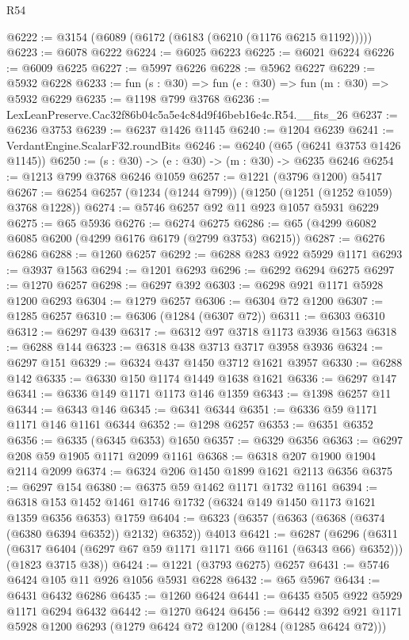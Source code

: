 \begin{lexlean}{R54}
\begin{coremodule}
@6222 := @3154 (@6089 (@6172 (@6183 (@6210 (@1176 @6215 @1192)))))
@6223 := @6078 @6222
@6224 := @6025 @6223
@6225 := @6021 @6224
@6226 := @6009 @6225
@6227 := @5997 @6226
@6228 := @5962 @6227
@6229 := @5932 @6228
@6233 := fun (s : @30) => fun (e : @30) => fun (m : @30) => @5932 @6229
@6235 := @1198 @799 @3768
@6236 := LexLeanPreserve.Cac32f86b04c5a5e4c84d9f46beb16e4c.R54.__fits_26
@6237 := @6236 @3753
@6239 := @6237 @1426 @1145
@6240 := @1204 @6239
@6241 := VerdantEngine.ScalarF32.roundBits
@6246 := @6240 (@65 (@6241 @3753 @1426 @1145))
@6250 := (s : @30) -> (e : @30) -> (m : @30) -> @6235 @6246
@6254 := @1213 @799 @3768 @6246 @1059
@6257 := @1221 (@3796 @1200) @5417
@6267 := @6254 @6257 (@1234 (@1244 @799)) (@1250 (@1251 (@1252 @1059) @3768 @1228))
@6274 := @5746 @6257 @92 @11 @923 @1057 @5931 @6229
@6275 := @65 @5936
@6276 := @6274 @6275
@6286 := @65 (@4299 @6082 @6085 @6200 (@4299 @6176 @6179 (@2799 @3753) @6215))
@6287 := @6276 @6286
@6288 := @1260 @6257
@6292 := @6288 @283 @922 @5929 @1171
@6293 := @3937 @1563
@6294 := @1201 @6293
@6296 := @6292 @6294 @6275
@6297 := @1270 @6257
@6298 := @6297 @392
@6303 := @6298 @921 @1171 @5928 @1200 @6293
@6304 := @1279 @6257
@6306 := @6304 @72 @1200
@6307 := @1285 @6257
@6310 := @6306 (@1284 (@6307 @72))
@6311 := @6303 @6310
@6312 := @6297 @439
@6317 := @6312 @97 @3718 @1173 @3936 @1563
@6318 := @6288 @144
@6323 := @6318 @438 @3713 @3717 @3958 @3936
@6324 := @6297 @151
@6329 := @6324 @437 @1450 @3712 @1621 @3957
@6330 := @6288 @142
@6335 := @6330 @150 @1174 @1449 @1638 @1621
@6336 := @6297 @147
@6341 := @6336 @149 @1171 @1173 @146 @1359
@6343 := @1398 @6257 @11
@6344 := @6343 @146
@6345 := @6341 @6344
@6351 := @6336 @59 @1171 @1171 @146 @1161 @6344
@6352 := @1298 @6257
@6353 := @6351 @6352
@6356 := @6335 (@6345 @6353) @1650
@6357 := @6329 @6356
@6363 := @6297 @208 @59 @1905 @1171 @2099 @1161
@6368 := @6318 @207 @1900 @1904 @2114 @2099
@6374 := @6324 @206 @1450 @1899 @1621 @2113 @6356
@6375 := @6297 @154
@6380 := @6375 @59 @1462 @1171 @1732 @1161
@6394 := @6318 @153 @1452 @1461 @1746 @1732 (@6324 @149 @1450 @1173 @1621 @1359 @6356 @6353) @1759
@6404 := @6323 (@6357 (@6363 (@6368 (@6374 (@6380 @6394 @6352)) @2132) @6352)) @4013
@6421 := @6287
    (@6296
      (@6311 (@6317 @6404 (@6297 @67 @59 @1171 @1171 @66 @1161 (@6343 @66) @6352)))
      (@1823 @3715 @38))
@6424 := @1221 (@3793 @6275) @6257
@6431 := @5746 @6424 @105 @11 @926 @1056 @5931 @6228
@6432 := @65 @5967
@6434 := @6431 @6432 @6286
@6435 := @1260 @6424
@6441 := @6435 @505 @922 @5929 @1171 @6294 @6432
@6442 := @1270 @6424
@6456 := @6442 @392 @921 @1171 @5928 @1200 @6293 (@1279 @6424 @72 @1200 (@1284 (@1285 @6424 @72)))

\end{coremodule}
\end{lexlean}

